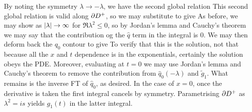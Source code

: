 \documentclass{article}
\begin{document}
By noting the symmetry $\lambda \to - \lambda$, we have the second global relation 
This second global relation is valid along $\partial D^+$, so we may substitute to give 
As before, we may show 
as $\left\lvert \lambda \right\rvert \to \infty$ for $\Re\lambda^2 \leq 0$, so by Jordan's lemma and Cauchy's theorem we may say that the contribution og the $\hat{q}$ term in the integral is 0. We may then deform back the $\hat{q}_0$ contour to give 
To verify that this is the solution, not that because all the $x$ and $t$ dependence is in the exponentials, certainly the solution obeys the PDE. Moreover, evaluating at $t=0$ we may use Jordan's lemma and Cauchy's theorem to remove the contribution from $\hat{q}_0(-\lambda)$ and $\tilde{g}_1$. What remains is the inverse FT of $\hat{q}_0$, as desired. In the case of $x=0$, once the derivative is taken the first integral cancels by symmetry. Parametrising $\partial D^+$ as $\lambda^2 = is$ yields $g_1(t)$ in the latter integral. 

\end{document}
